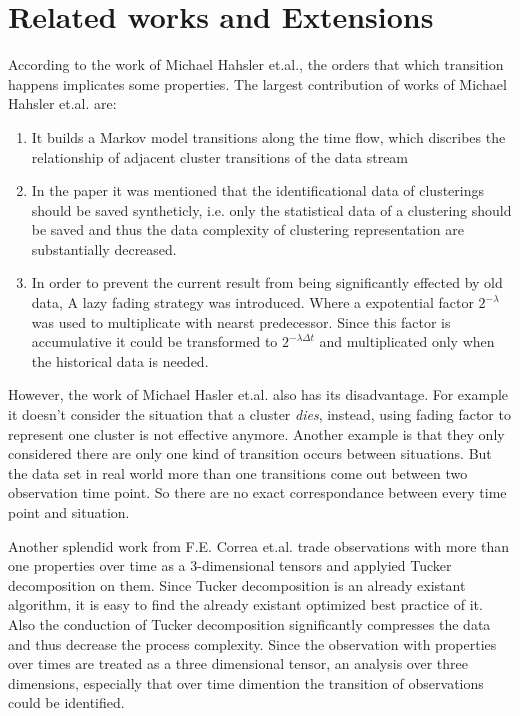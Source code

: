 \documentclass{sig-alternate}
\begin{document}
\section{Related works and Extensions}
According to the work of Michael Hahsler et.al.\cite{MICHAEL:Markov}, the orders that which transition happens implicates some properties. The largest contribution of works of Michael Hahsler et.al. are:
\begin{enumerate}
    \item It builds a Markov model transitions along the time flow, which discribes the relationship of adjacent cluster transitions of the data stream
    \item In the paper it was mentioned that the identificational data of clusterings should be saved syntheticly, i.e. only the statistical data of a clustering should be saved and thus the data complexity of clustering representation are substantially decreased.
    \item In order to prevent the current result from being significantly effected by old data, A lazy fading strategy was introduced. Where a expotential factor $2^{-\lambda}$ was used to multiplicate with nearst predecessor. Since this factor is accumulative it could be transformed to $2^{-\lambda \Delta t}$ and multiplicated only when the historical data is needed.
\end{enumerate}

However, the work of Michael Hasler et.al. also has its disadvantage. For example it doesn't consider the situation that a cluster \emph{dies}, instead, using fading factor to represent one cluster is not effective anymore. Another example is that they only considered there are only one kind of transition occurs between situations. But the data set in real world more than one transitions come out between two observation time point. So there are no exact correspondance between every time point and situation.

Another splendid work from F.E. Correa et.al.\cite{CORREA:tuckerTensor} trade observations with more than one properties over time as a 3-dimensional tensors and applyied Tucker decomposition\cite{TUCKER:three-mode} on them. Since Tucker decomposition is an already existant algorithm, it is easy to find the already existant optimized best practice of it. Also the conduction of Tucker decomposition significantly compresses the data and thus decrease the process complexity. Since the observation with properties over times are treated as a three dimensional tensor, an analysis over three dimensions, especially that over time dimention the transition of observations could be identified.
\end{document}
